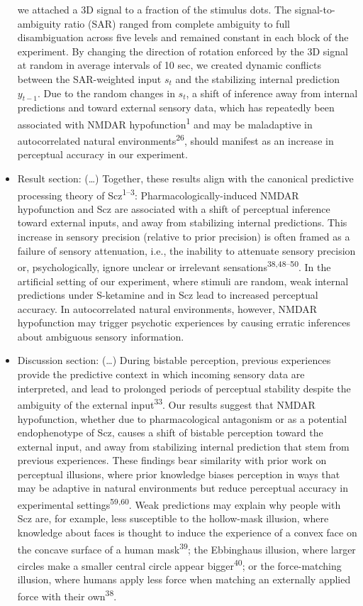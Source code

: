 \documentclass[
]{article}
\begin{document}
\begin{itemize}
  we attached a 3D signal to a fraction of the stimulus dots. The
  signal-to-ambiguity ratio (SAR) ranged from complete ambiguity to full
  disambiguation across five levels and remained constant in each block
  of the experiment. By changing the direction of rotation enforced by
  the 3D signal at random in average intervals of 10 sec, we created
  dynamic conflicts between the SAR-weighted input \(s_t\) and the
  stabilizing internal prediction \(y_{t-1}\). Due to the random changes
  in \(s_t\), a shift of inference away from internal predictions and
  toward external sensory data, which has repeatedly been associated
  with NMDAR hypofunction\textsuperscript{1} and may be maladaptive in
  autocorrelated natural environments\textsuperscript{26}, should
  manifest as an increase in perceptual accuracy in our experiment.
\item
  Result section: (\ldots) Together, these results align with the
  canonical predictive processing theory of Scz\textsuperscript{1--3}:
  Pharmacologically-induced NMDAR hypofunction and Scz are associated
  with a shift of perceptual inference toward external inputs, and away
  from stabilizing internal predictions. This increase in sensory
  precision (relative to prior precision) is often framed as a failure
  of sensory attenuation, i.e., the inability to attenuate sensory
  precision or, psychologically, ignore unclear or irrelevant
  sensations\textsuperscript{38,48--50}. In the artificial setting of
  our experiment, where stimuli are random, weak internal predictions
  under S-ketamine and in Scz lead to increased perceptual accuracy. In
  autocorrelated natural environments, however, NMDAR hypofunction may
  trigger psychotic experiences by causing erratic inferences about
  ambiguous sensory information.
\item
  Discussion section: (\ldots) During bistable perception, previous
  experiences provide the predictive context in which incoming sensory
  data are interpreted, and lead to prolonged periods of perceptual
  stability despite the ambiguity of the external
  input\textsuperscript{33}. Our results suggest that NMDAR
  hypofunction, whether due to pharmacological antagonism or as a
  potential endophenotype of Scz, causes a shift of bistable perception
  toward the external input, and away from stabilizing internal
  prediction that stem from previous experiences. These findings bear
  similarity with prior work on perceptual illusions, where prior
  knowledge biases perception in ways that may be adaptive in natural
  environments but reduce perceptual accuracy in experimental
  settings\textsuperscript{59,60}. Weak predictions may explain why
  people with Scz are, for example, less susceptible to the hollow-mask
  illusion, where knowledge about faces is thought to induce the
  experience of a convex face on the concave surface of a human
  mask\textsuperscript{39}; the Ebbinghaus illusion, where larger
  circles make a smaller central circle appear
  bigger\textsuperscript{40}; or the force-matching illusion, where
  humans apply less force when matching an externally applied force with
  their own\textsuperscript{38}.
\end{itemize}
\end{document}
